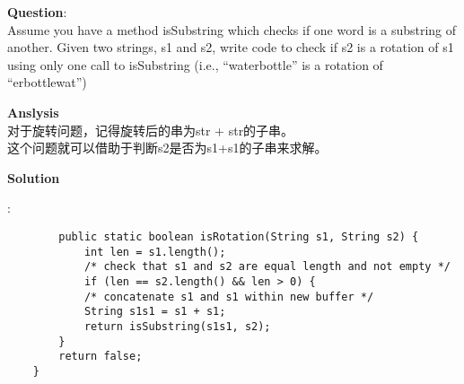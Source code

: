     
\begin{description}
    \item{\textbf{Question}}:\\%
		Assume you have a method isSubstring which checks if one word is a substring of another. Given two strings, s1 and s2, write code to check if s2 is a rotation of s1 using only one call to isSubstring (i.e., “waterbottle” is a rotation of “erbottlewat”)

    \item{\textbf{Anslysis}}\\
		对于旋转问题，记得旋转后的串为str + str的子串。\\
		这个问题就可以借助于判断s2是否为s1+s1的子串来求解。

    \item{\textbf{Solution}}
	\item{} : \\
		\begin{lstlisting}
		public static boolean isRotation(String s1, String s2) {
			int len = s1.length();
			/* check that s1 and s2 are equal length and not empty */
			if (len == s2.length() && len > 0) {
			/* concatenate s1 and s1 within new buffer */
			String s1s1 = s1 + s1;
			return isSubstring(s1s1, s2);
		}
		return false;
	}

		\end{lstlisting}

\end{description}

